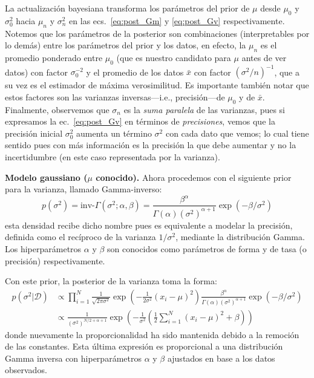 \begin{remark}
	La actualización bayesiana transforma los parámetros del prior de  $\mu$ desde  $\mu_0$ y $\sigma_0^2$ hacia $\mu_n$ y $\sigma_n^2$ en las ecs.~\eqref{eq:post_Gm} y \eqref{eq:post_Gv} respectivamente. Notemos que los  parámetros de la posterior son combinaciones (interpretables por lo demás) entre los parámetros del prior y los datos, en efecto, la $\mu_n$ es el promedio ponderado entre  $\mu_0$ (que es nuestro candidato para $\mu$ antes de ver datos) con factor $\sigma_0^{-2}$ y el promedio de los datos $\bar{x}$ con factor $(\sigma^{2}/n)^{-1}$, que a su vez es el estimador de máxima verosimilitud. Es importante también notar que  estos  factores son las varianzas inversas---i.e., precisión---de $\mu_0$ y de $\bar{x}$. Finalmente, observemos que $\sigma_n$ es la \emph{suma paralela} de las varianzas, pues  si expresamos la ec.~\eqref{eq:post_Gv} en términos de \emph{precisiones}, vemos que la precisión inicial $\sigma_0^2$ aumenta un término $\sigma^2$ con cada dato que vemos; lo cual tiene sentido pues con más información es la precisión la que debe aumentar y no la incertidumbre (en este caso representada por la varianza).
\end{remark}
\begin{example} \textbf{Modelo gaussiano ($\mu$ conocido).} Ahora procedemos con el siguiente prior para la varianza, llamado Gamma-inverso:
 \begin{equation}
 	p(\sigma^2)= \text{inv-}\Gamma(\sigma^2;\alpha,\beta) = \frac{\beta^\alpha}{\Gamma(\alpha) (\sigma^2)^{\alpha+1}}\exp(-\beta/\sigma^2)
 \end{equation}
 esta densidad recibe dicho nombre pues es equivalente a modelar la precisión, definida como el recíproco de la varianza $1/\sigma^2$, mediante la distribución Gamma. Los hiperparámetros $\alpha$ y $\beta$ son conocidos como parámetros de forma y de tasa (o precisión) respectivamente. 

 Con este prior, la posterior de la varianza toma la forma:
 \begin{align}
 	p(\sigma^2|\mathcal{D}) &\propto \prod_{i=1}^N \frac{1}{\sqrt{2\pi\sigma^2}}\exp\left(-\frac{1}{2\sigma^2}(x_i-\mu)^2\right) \frac{\beta^\alpha}{\Gamma(\alpha) (\sigma^2)^{\alpha+1}}\exp(-\beta/\sigma^2)\\
 	&\propto  \frac{1}{(\sigma^2)^{N/2+\alpha+1}}\exp\left(-\frac{1}{\sigma^2}\left(\frac{1}{2}\sum_{i=1}^N(x_i-\mu)^2 +\beta\right) \right)\nonumber
 \end{align} 
 donde nuevamente la proporcionalidad ha sido mantenida debido a la remoción de las constantes. Esta última expresión es proporcional a una distribución Gamma inversa con hiperparámetros $\alpha$ y $\beta$ ajustados en base a los datos observados. 


\end{example}





